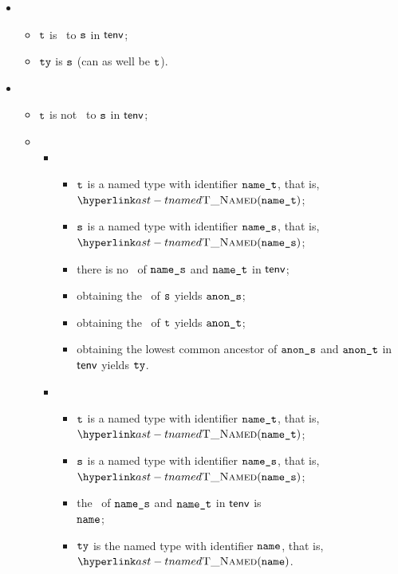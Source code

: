 \ProseParagraph
\OneApplies
\begin{itemize}
  \item {}
  \begin{itemize}
    \item $\texttt{t}$ is \typeequal\ to $\texttt{s}$ in $\textsf{tenv}$;
    \item $\texttt{ty}$ is $\texttt{s}$ (can as well be $\texttt{t}$).
  \end{itemize}

  \item \AllApply
  \begin{itemize}
    \item $\texttt{t}$ is not \typeequal\ to $\texttt{s}$ in $\textsf{tenv}$;
    \item \OneApplies
    \begin{itemize}
      \item {}
      \begin{itemize}
        \item $\texttt{t}$ is a named type with identifier $\texttt{name\_t}$, that is, $\TNamed(\namesubt)$;
        \item $\texttt{s}$ is a named type with identifier $\texttt{name\_s}$, that is, $\TNamed(\namesubs)$;
        \item there is no \namedlowestcommonancestor\ of $\texttt{name\_s}$ and $\texttt{name\_t}$ in $\textsf{tenv}$;
        \item obtaining the \underlyingtype\ of $\texttt{s}$ yields $\texttt{anon\_s}$\ProseOrTypeError;
        \item obtaining the \underlyingtype\ of $\texttt{t}$ yields $\texttt{anon\_t}$\ProseOrTypeError;
        \item obtaining the lowest common ancestor of $\texttt{anon\_s}$ and $\texttt{anon\_t}$ in $\textsf{tenv}$ yields $\texttt{ty}$\ProseOrTypeError.
      \end{itemize}

      \item {}
      \begin{itemize}
        \item $\texttt{t}$ is a named type with identifier $\texttt{name\_t}$, that is, $\TNamed(\namesubt)$;
        \item $\texttt{s}$ is a named type with identifier $\texttt{name\_s}$, that is, $\TNamed(\namesubs)$;
        \item the \namedlowestcommonancestor\ of $\texttt{name\_s}$ and $\texttt{name\_t}$ in $\textsf{tenv}$ is \\
              $\texttt{name}$\ProseOrTypeError;
        \item $\texttt{ty}$ is the named type with identifier $\texttt{name}$, that is, $\TNamed(\name)$.
      \end{itemize}


\end{itemize}
\end{itemize}
\end{itemize}
